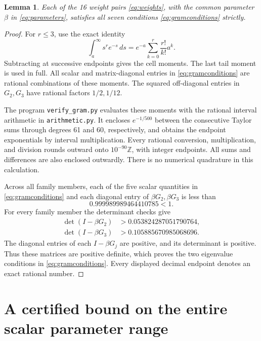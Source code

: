 \documentclass[11pt]{article}
\newtheorem{lemma}[theorem]{Lemma}
\theoremstyle{remark}\newtheorem{remark}[theorem]{Remark}
\begin{document}
\begin{lemma}\label{lem:gram_certificate}
Each of the 16 weight pairs \eqref{eq:weights}, with the common
parameter \(\beta\) in \eqref{eq:parameters}, satisfies all seven
conditions \eqref{eq:gramconditions} strictly.
\end{lemma}
\begin{proof}
For \(r\le3\), use the exact identity
\begin{equation}\label{eq:moments}
\int_a^\infty s^re^{-s}\,ds
=e^{-a}\sum_{k=0}^r\frac{r!}{k!}a^k.
\end{equation}
Subtracting at successive endpoints gives the cell moments. The last
tail moment is used in full. All scalar and matrix-diagonal entries
in \eqref{eq:gramconditions} are rational combinations of these
moments. The squared off-diagonal entries in \(G_2,G_3\) have
rational factors \(1/2,1/12\).

The program \texttt{verify\_gram.py} evaluates these moments with
the rational interval arithmetic in \texttt{arithmetic.py}. It encloses
\(e^{-1/500}\) between the consecutive Taylor sums through degrees
61 and 60, respectively, and obtains the endpoint exponentials by
interval multiplication. Every rational conversion, multiplication,
and division rounds outward onto \(10^{-90}\mathbb Z\), with integer
endpoints. All sums and differences are also enclosed outwardly.
There is no numerical quadrature in this calculation.

Across all family members, each of the five scalar quantities in
\eqref{eq:gramconditions} and each diagonal entry of
\(\beta G_2,\beta G_3\) is less than
\[
0.999989989464410785<1.
\]
For every family member the determinant checks give
\begin{align*}
\det(I-\beta G_2)&>0.053824287051790764,\\
\det(I-\beta G_3)&>0.105885670985068696.
\end{align*}
The diagonal entries of each \(I-\beta G_j\) are positive, and its
determinant is positive. Thus these matrices are positive definite,
which proves the two eigenvalue conditions in
\eqref{eq:gramconditions}. Every displayed decimal endpoint denotes
an exact rational number.
\end{proof}

\section{A certified bound on the entire scalar parameter range}
\end{document}
